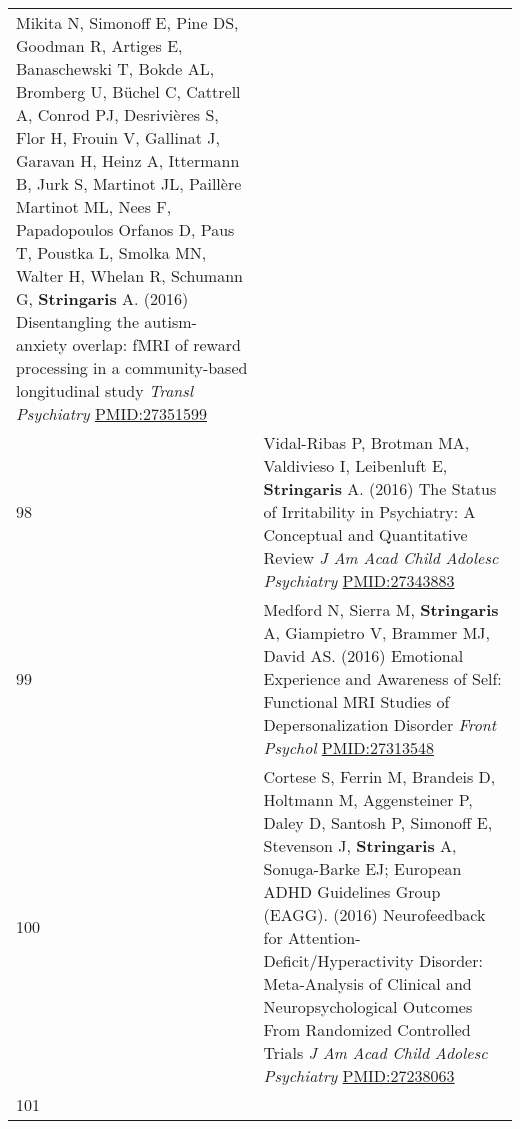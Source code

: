 \documentclass[
]{article}
\begin{document}
\begin{longtable}[]{@{}ll@{}}
\begin{minipage}[t]{0.94\columnwidth}
Mikita N, Simonoff E, Pine DS, Goodman R, Artiges E, Banaschewski T,
Bokde AL, Bromberg U, Büchel C, Cattrell A, Conrod PJ, Desrivières S,
Flor H, Frouin V, Gallinat J, Garavan H, Heinz A, Ittermann B, Jurk S,
Martinot JL, Paillère Martinot ML, Nees F, Papadopoulos Orfanos D, Paus
T, Poustka L, Smolka MN, Walter H, Whelan R, Schumann G,
\textbf{Stringaris} A. (2016) Disentangling the autism-anxiety overlap:
fMRI of reward processing in a community-based longitudinal study
\emph{Transl Psychiatry} \url{PMID:27351599}\strut
\end{minipage}\tabularnewline
\begin{minipage}[t]{0.01\columnwidth}\raggedright
98\strut
\end{minipage} & \begin{minipage}[t]{0.94\columnwidth}\raggedright
Vidal-Ribas P, Brotman MA, Valdivieso I, Leibenluft E,
\textbf{Stringaris} A. (2016) The Status of Irritability in Psychiatry:
A Conceptual and Quantitative Review \emph{J Am Acad Child Adolesc
Psychiatry} \url{PMID:27343883}\strut
\end{minipage}\tabularnewline
\begin{minipage}[t]{0.01\columnwidth}\raggedright
99\strut
\end{minipage} & \begin{minipage}[t]{0.94\columnwidth}\raggedright
Medford N, Sierra M, \textbf{Stringaris} A, Giampietro V, Brammer MJ,
David AS. (2016) Emotional Experience and Awareness of Self: Functional
MRI Studies of Depersonalization Disorder \emph{Front Psychol}
\url{PMID:27313548}\strut
\end{minipage}\tabularnewline
\begin{minipage}[t]{0.01\columnwidth}\raggedright
100\strut
\end{minipage} & \begin{minipage}[t]{0.94\columnwidth}\raggedright
Cortese S, Ferrin M, Brandeis D, Holtmann M, Aggensteiner P, Daley D,
Santosh P, Simonoff E, Stevenson J, \textbf{Stringaris} A, Sonuga-Barke
EJ; European ADHD Guidelines Group (EAGG). (2016) Neurofeedback for
Attention-Deficit/Hyperactivity Disorder: Meta-Analysis of Clinical and
Neuropsychological Outcomes From Randomized Controlled Trials \emph{J Am
Acad Child Adolesc Psychiatry} \url{PMID:27238063}\strut
\end{minipage}\tabularnewline
\begin{minipage}[t]{0.01\columnwidth}\raggedright
101\strut
\end{minipage} & \begin{minipage}[t]{0.94\columnwidth}\raggedright

\end{minipage}
\end{longtable}
\end{document}
